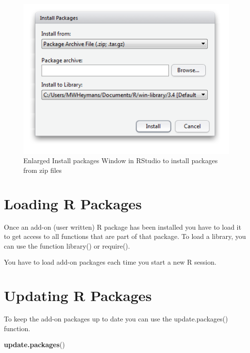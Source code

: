 \documentclass[
]{book}
\newenvironment{Shaded}{\begin{snugshade}}{\end{snugshade}}
\newcommand{\KeywordTok}[1]{\textcolor[rgb]{0.13,0.29,0.53}{\textbf{#1}}}
\newcommand{\NormalTok}[1]{#1}
\begin{document}
\begin{figure}

{\centering \includegraphics[width=0.95\linewidth]{images/fig1.26b} 

}

\caption{Enlarged Install packages Window in RStudio to install packages from zip files}\label{fig:fig28}
\end{figure}

\hypertarget{loading-r-packages}{%
\section{Loading R Packages}\label{loading-r-packages}}

Once an add-on (user written) R package has been installed you have to
load it to get access to all functions that are part of that package. To
load a library, you can use the function library() or require().

You have to load add-on packages each time you start a new R session.

\hypertarget{updating-r-packages}{%
\section{Updating R Packages}\label{updating-r-packages}}

To keep the add-on packages up to date you can use the update.packages()
function.

\begin{Shaded}
\begin{Highlighting}[]
\KeywordTok{update.packages}\NormalTok{()}
\end{Highlighting}
\end{Shaded}
\end{document}
